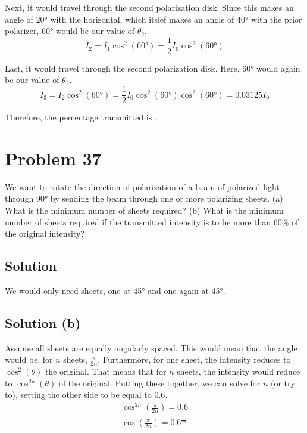 \documentclass[12pt]{article}
\begin{document}
            Next, it would travel through the second polarization disk.
            Since this makes an angle of 20\unit{\degree} with the horizontal, which itslef makes an angle of 40\unit{\degree} with the prior polarizer, 60\unit{\degree} would be our value of $\theta_2$.
            \begin{equation}
                I_2 = I_1 \cos^2(60\unit{\degree}) = \frac{1}{2}I_0 \cos^2(60\unit{\degree})
            \end{equation}

            Last, it would travel through the second polarization disk.
            Here, 60\unit{\degree} would again be our value of $\theta_2$.
            \begin{equation}
                I_3 = I_2 \cos^2(60\unit{\degree}) = \frac{1}{2}I_0 \cos^2(60\unit{\degree}) \cos^2(60\unit{\degree}) = 0.03125 I_0
            \end{equation}

            Therefore, the percentage transmitted is . 
            

    \pagebreak
    \section{Problem 37}
        We want to rotate the direction of polarization of a beam of polarized light through 90\unit{\degree} by sending the beam through one or more polarizing sheets. 
        (a) What is the minimum number of sheets required? 
        (b) What is the minimum number of sheets required if the transmitted intensity is to be more than 60\% of the original intensity?

        \subsection{Solution}
            We would only need  sheets, one at 45\unit{\degree} and one again at 45\unit{\degree}.

        \subsection{Solution (b)}
            Assume all sheets are equally angularly spaced.
            This would mean that the angle would be, for $n$ sheets, $\frac{\pi}{2n}$.
            Furthermore, for one sheet, the intensity reduces to $\cos^2(\theta)$ the original.
            That means that for $n$ sheets, the intensity would reduce to $\cos^{2n}(\theta)$ of the original.
            Putting these together, we can solve for $n$ (or try to), setting the other side to be equal to $0.6$.
            \begin{gather}
                \cos^{2n}\left( \frac{\pi}{2n} \right) = 0.6\\
                \cos\left( \frac{\pi}{2n} \right) = 0.6^{\frac{1}{2n}}
            \end{gather}
\end{document}
